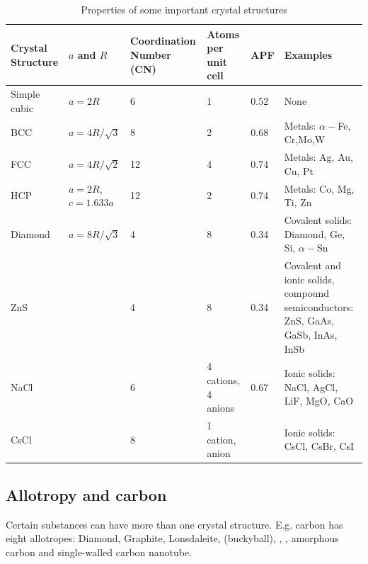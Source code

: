 \begin{table}[ht!]
    \centering
    \begin{tabularx}{0.9\linewidth}{p{2cm}p{2cm}p{2.5cm}p{1.8cm}p{1.5cm}X}
    \toprule
        Crystal Structure & $a$ and $R$ & Coordination Number (CN) & Atoms per unit cell & APF & Examples \\ \midrule
        Simple cubic & $a = 2R$ & 6 & 1 & 0.52 & None \\
        BCC & $a=4R/\sqrt{3}$ & 8 & 2 & 0.68 & Metals: $\alpha-$Fe, Cr,Mo,W \\
        FCC & $a=4R/\sqrt{2}$ & 12 & 4 & 0.74 & Metals: Ag, Au, Cu, Pt \\
        HCP & $a=2R$, $c=1.633a$ & 12 & 2 & 0.74 & Metals: Co, Mg, Ti, Zn \\
        Diamond & $a=8R/\sqrt{3}$ & 4 & 8 & 0.34 & Covalent solids: Diamond, Ge, Si, $\alpha-$Sn \\
        ZnS & & 4 & 8 & 0.34 & Covalent and ionic solids, compound semiconductors: ZnS, GaAs, GaSb, InAs, InSb \\
        NaCl & & 6 & 4 cations, 4 anions & 0.67 & Ionic solids: NaCl, AgCl, LiF, MgO, CaO \\
        CsCl & & 8 & 1 cation, \newline 1 anion & & Ionic solids: CsCl, CsBr, CsI \\
    \bottomrule
    \end{tabularx}
    \caption{Properties of some important crystal structures}
\end{table}

\subsection{Allotropy and carbon}
Certain substances can have more than one crystal structure. 
E.g. carbon has eight allotropes: Diamond, Graphite, Lonsdaleite,  (buckyball), ,  , amorphous carbon and single-walled carbon nanotube.